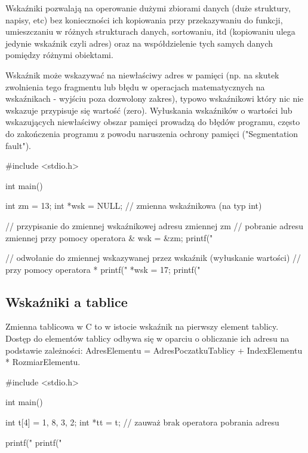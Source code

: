 \documentclass{pdfBooklets}
\begin{document}
Wskaźniki pozwalają na operowanie dużymi zbiorami danych (duże struktury, napisy, etc) bez konieczności ich kopiowania przy przekazywaniu do funkcji, umieszczaniu w różnych strukturach danych, sortowaniu, itd (kopiowaniu ulega jedynie wskaźnik czyli adres) oraz na współdzielenie tych samych danych pomiędzy różnymi obiektami.

Wskaźnik może wskazywać na niewłaściwy adres w pamięci (np. na skutek zwolnienia tego fragmentu lub błędu w operacjach matematycznych na wskaźnikach - wyjściu poza dozwolony zakres), typowo wskaźnikowi który nic nie wskazuje przypisuje się wartość  (zero). Wyłuskania wskaźników o wartości  lub wskazujących niewłaściwy obszar pamięci prowadzą do błędów programu, często do zakończenia programu z powodu naruszenia ochrony pamięci ("Segmentation fault"). 

\begin{CodeFrame*}[c]{}
#include <stdio.h>

int main() {
    int zm = 13;
    int *wsk = NULL; // zmienna wskaźnikowa (na typ int)
    
    // przypisanie do zmiennej wskaźnikowej adresu zmiennej zm
    // pobranie adresu zmiennej przy pomocy operatora &
    wsk = &zm;
    printf("%
    
    // odwołanie do zmiennej wskazywanej przez wskaźnik (wyłuskanie wartości)
    // przy pomocy operatora *
    printf("%
    *wsk = 17;
    printf("%
}
\end{CodeFrame*}

\subsection{Wskaźniki a tablice}

Zmienna tablicowa w C to w istocie wskaźnik na pierwszy element tablicy.
Dostęp do elementów tablicy odbywa się w oparciu o obliczanie ich adresu na podstawie zależności: AdresElementu = AdresPoczatkuTablicy + IndexElementu * RozmiarElementu.

\begin{CodeFrame*}[c]{}
#include <stdio.h>

int main() {
  int t[4] = {1, 8, 3, 2};
  int *tt = t; // zauważ brak operatora pobrania adresu
  
  printf("%
  printf("%
}
\end{CodeFrame*}
\end{document}
